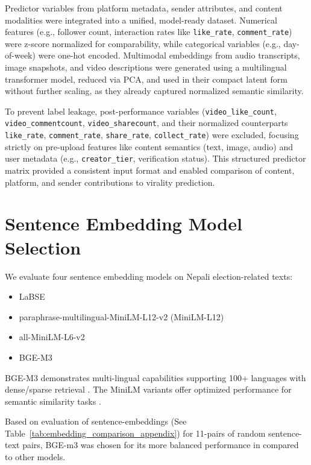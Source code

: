 \documentclass[12pt,a4paper]{report}
\begin{document}
Predictor variables from platform metadata, sender attributes, and content modalities were integrated into a unified, model-ready dataset. Numerical features (e.g., follower count, interaction rates like \texttt{like\_rate}, \texttt{comment\_rate}) were z-score normalized for comparability, while categorical variables (e.g., day-of-week) were one-hot encoded. Multimodal embeddings from audio transcripts, image snapshots, and video descriptions were generated using a multilingual transformer model, reduced via PCA, and used in their compact latent form without further scaling, as they already captured normalized semantic similarity.

To prevent label leakage, post-performance variables (\texttt{video\_like\_count}, \texttt{video\_commentcount}, \texttt{video\_sharecount}, and their normalized counterparts \texttt{like\_rate}, \texttt{comment\_rate}, \texttt{share\_rate}, \texttt{collect\_rate}) were excluded, focusing strictly on pre-upload features like content semantics (text, image, audio) and user metadata (e.g., \texttt{creator\_tier}, verification status). This structured predictor matrix provided a consistent input format and enabled comparison of content, platform, and sender contributions to virality prediction.
\newpage
\section{Sentence Embedding Model Selection}
We evaluate four sentence embedding models on Nepali election-related texts:
\begin{itemize}
    \item LaBSE \parencite{reimers-2019}
    \item paraphrase-multilingual-MiniLM-L12-v2 (MiniLM-L12) \parencite{paraphrase-multilingual-MiniLM-L12-v2}
    \item all-MiniLM-L6-v2 \parencite{all-MiniLM-L6-v2}
    \item BGE-M3 \parencite{bge-m3}
\end{itemize}

BGE-M3 demonstrates multi-lingual capabilities supporting 100+ languages with dense/sparse retrieval \parencite{bge-m3}. The MiniLM variants offer optimized performance for semantic similarity tasks \parencite{reimers-2019}.

Based on evaluation of sentence-embeddings (See Table~\ref{tab:embedding_comparison_appendix}) for 11-pairs of random sentence-text pairs, BGE-m3 was chosen for its more balanced performance in compared to other models. 
\newpage
\end{document}

